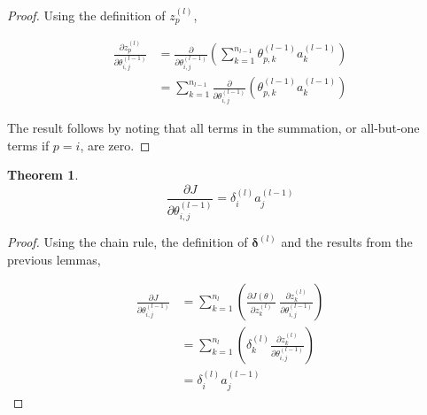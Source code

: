 \documentclass{article}[11pt]
\newtheorem{theorem}{Theorem}
\begin{document}
        \begin{proof}
            
            Using the definition of $z^{(l)}_p$,
            
            $$ \begin{aligned}
            \frac{\partial z^{(l)}_p}{\partial \theta^{(l-1)}_{i,j}}
            &= \frac{\partial}{\partial \theta^{(l-1)}_{i,j}} \left( \sum_{k=1}^{n_{l-1}} \theta^{(l-1)}_{p,k} a^{(l-1)}_k \right) \\
            &= \sum_{k=1}^{n_{l-1}} \frac{\partial}{\partial \theta^{(l-1)}_{i,j}} \left( \theta^{(l-1)}_{p,k} a^{(l-1)}_k \right)
            \end{aligned} $$
            
            The result follows by noting that all terms in the summation, or all-but-one terms if $p = i$, are zero.
            
        \end{proof}
        
        
        
        
        \begin{theorem}
            
            $$
            \frac{\partial J}{\partial \theta^{(l-1)}_{i,j}} = \delta^{(l)}_i a^{(l-1)}_j
            $$
            
        \end{theorem}
        
        \begin{proof}
        
            Using the chain rule, the definition of $\boldsymbol{\delta}^{(l)}$ and the results from the previous lemmas,
            
            $$ \begin{aligned}
            \frac{\partial J}{\partial \theta^{(l-1)}_{i,j}}
            &= \sum_{k=1}^{n_l} \left( \frac{\partial J(\theta)}{\partial z^{(l)}_k} \ \frac{\partial z^{(l)}_k}{\partial \theta^{(l-1)}_{i,j}} \right) \\
            &= \sum_{k=1}^{n_l} \left( \delta^{(l)}_k \frac{\partial z^{(l)}_k}{\partial \theta^{(l-1)}_{i,j}} \right) \\
            &= \delta^{(l)}_i a^{(l-1)}_j
            \end{aligned}$$
        
        \end{proof}
        
        
\end{document}
